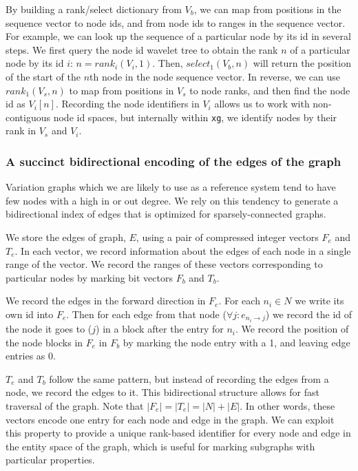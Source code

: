 \documentclass[12pt]{article}
\begin{document}
By building a rank/select dictionary from $V_b$, we can map from positions in the sequence vector to node ids, and from node ids to ranges in the sequence vector.
For example, we can look up the sequence of a particular node by its id in several steps.
We first query the node id wavelet tree to obtain the rank $n$ of a particular node by its id $i$: $n = rank_{i}(V_i, 1)$.
Then, $select_1(V_b, n)$ will return the position of the start of the $n$th node in the node sequence vector.
In reverse, we can use $rank_1(V_s, n)$ to map from positions in $V_s$ to node ranks, and then find the node id as $V_i[n]$.
Recording the node identifiers in $V_i$ allows us to work with non-contiguous node id spaces, but internally within {\tt xg}, we identify nodes by their rank in $V_s$ and $V_i$.

\subsubsection{A succinct bidirectional encoding of the edges of the graph}

Variation graphs which we are likely to use as a reference system tend to have few nodes with a high in or out degree.
We rely on this tendency to generate a bidirectional index of edges that is optimized for sparsely-connected graphs.

We store the edges of graph, $E$, using a pair of compressed integer vectors $F_e$ and $T_e$.
In each vector, we record information about the edges of each node in a single range of the vector.
We record the ranges of these vectors corresponding to particular nodes by marking bit vectors $F_b$ and $T_b$.

We record the edges in the forward direction in $F_e$.
For each $n_i \in N$ we write its own id into $F_e$.
Then for each edge from that node ($\forall j : e_{n_i \rightarrow j}$) we record the id of the node it goes to ($j$) in a block after the entry for $n_i$.
We record the position of the node blocks in $F_e$ in $F_b$ by marking the node entry with a 1, and leaving edge entries as 0.

$T_e$ and $T_b$ follow the same pattern, but instead of recording the edges from a node, we record the edges to it.
This bidirectional structure allows for fast traversal of the graph.
Note that $|F_e| = |T_e| = |N| + |E|$.
In other words, these vectors encode one entry for each node and edge in the graph.
We can exploit this property to provide a unique rank-based identifier for every node and edge in the entity space of the graph, which is useful for marking subgraphs with particular properties.
\end{document}
